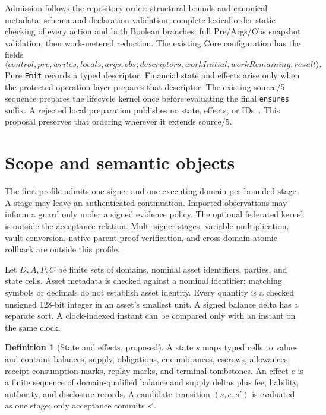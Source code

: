 \documentclass[11pt,a4paper]{article}
\theoremstyle{definition}
\newtheorem{definition}{Definition}
\begin{document}
Admission follows the repository order: structural bounds and canonical metadata; schema and declaration validation; complete lexical-order static checking of every action and both Boolean branches; full Pre/Args/Obs snapshot validation; then work-metered reduction. The existing Core configuration has the fields
\[
\langle control,pre,writes,locals,args,obs,descriptors,
workInitial,workRemaining,result\rangle.
\]
Pure \texttt{Emit} records a typed descriptor. Financial state and effects arise only when the protected operation layer prepares that descriptor. The existing source/5 sequence prepares the lifecycle kernel once before evaluating the final \texttt{ensures} suffix. A rejected local preparation publishes no state, effects, or IDs~\cite{CORE,SRC5}. This proposal preserves that ordering wherever it extends source/5.

\section{Scope and semantic objects}
The first profile admits one signer and one executing domain per bounded stage. A stage may leave an authenticated continuation. Imported observations may inform a guard only under a signed evidence policy. The optional federated kernel is outside the acceptance relation. Multi-signer stages, variable multiplication, vault conversion, native parent-proof verification, and cross-domain atomic rollback are outside this profile.

Let $D,A,P,C$ be finite sets of domains, nominal asset identifiers, parties, and state cells. Asset metadata is checked against a nominal identifier; matching symbols or decimals do not establish asset identity. Every quantity is a checked unsigned 128-bit integer in an asset's smallest unit. A signed balance delta has a separate sort. A clock-indexed instant can be compared only with an instant on the same clock.

\begin{definition}[State and effects, proposed]
A state $s$ maps typed cells to values and contains balances, supply, obligations, encumbrances, escrows, allowances, receipt-consumption marks, replay marks, and terminal tombstones. An effect $e$ is a finite sequence of domain-qualified balance and supply deltas plus fee, liability, authority, and disclosure records. A candidate transition $(s,e,s')$ is evaluated as one stage; only acceptance commits $s'$.
\end{definition}
\end{document}
